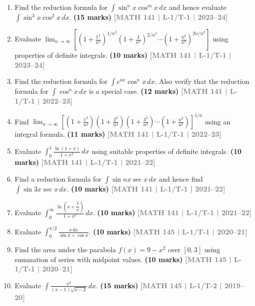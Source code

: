 \documentclass[12pt,a4paper]{article}
\newcommand{\yr}[1]{\hfill\textcolor{gray}{\small\textbf{[#1]}}}
\newcommand{\mk}[1]{\textcolor{orange!70!black}{\small\textbf{(#1 marks)}}}
\begin{document}
\begin{enumerate}

\item Find the reduction formula for $\displaystyle\int\sin^{n}x\cos^{m}x\,dx$ and hence evaluate $\displaystyle\int\sin^{3}x\cos^{2}x\,dx$.
\mk{15} \yr{MATH 141 | L-1/T-1 | 2023--24}

\item Evaluate $\displaystyle\lim_{n\to\infty}\!\left[\left(1+\frac{1^{2}}{n^{2}}\right)^{1/n^{2}}\!\!\left(1+\frac{4}{n^{2}}\right)^{2/n^{2}}\!\!\cdots\left(1+\frac{n^{2}}{n^{2}}\right)^{2n/n^{2}}\right]$ using properties of definite integrals.
\mk{10} \yr{MATH 141 | L-1/T-1 | 2023--24}

\item Find the reduction formula for $\displaystyle\int e^{ax}\cos^{n}x\,dx$. Also verify that the reduction formula for $\displaystyle\int\cos^{n}x\,dx$ is a special case.
\mk{12} \yr{MATH 141 | L-1/T-1 | 2022--23}

\item Find $\displaystyle\lim_{n\to\infty}\!\left[\left(1+\frac{1^{2}}{n^{2}}\right)\!\left(1+\frac{2^{2}}{n^{2}}\right)\!\left(1+\frac{3^{2}}{n^{2}}\right)\cdots\left(1+\frac{n^{2}}{n^{2}}\right)\right]^{1/n}$ using an integral formula.
\mk{11} \yr{MATH 141 | L-1/T-1 | 2022--23}

\item Evaluate $\displaystyle\int_{0}^{1}\frac{\ln(1+x)}{1+x^{2}}\,dx$ using suitable properties of definite integrals.
\mk{10} \yr{MATH 141 | L-1/T-1 | 2021--22}

\item Find a reduction formula for $\displaystyle\int\sin{n}x\sec x\,dx$ and hence find $\displaystyle\int\sin{3}x\sec x\,dx$.
\mk{10} \yr{MATH 141 | L-1/T-1 | 2021--22}

\item Evaluate $\displaystyle\int_{0}^{\infty}\frac{\ln\!\left(x+\dfrac{1}{x}\right)}{1+x^{2}}\,dx$.
\mk{10} \yr{MATH 141 | L-1/T-1 | 2021--22}

\item Evaluate $\displaystyle\int_{0}^{\pi/2}\frac{x\,dx}{\sin x+\cos x}$.
\mk{10} \yr{MATH 145 | L-1/T-1 | 2020--21}

\item Find the area under the parabola $f(x)=9-x^{2}$ over $[0,3]$ using summation of series with midpoint values.
\mk{10} \yr{MATH 145 | L-1/T-1 | 2020--21}

\item Evaluate $\displaystyle\int\frac{x^{3}}{(x-1)\sqrt{x-2}}\,dx$.
\mk{15} \yr{MATH 145 | L-1/T-2 | 2019--20}


\end{enumerate}
\end{document}
